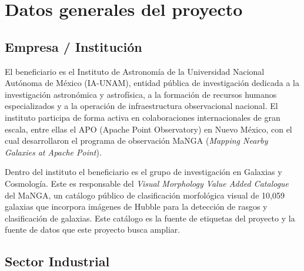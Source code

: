 \documentclass[12pt]{article}
\begin{document}
\newpage


\newpage

\tableofcontents

\newpage


\section{Datos generales del proyecto}

\subsection{Empresa / Institución}

El beneficiario es el Instituto de Astronomía de la Universidad Nacional Autónoma de México (IA-UNAM), entidad pública de investigación dedicada a la investigación astronómica y astrofísica, a la formación de recursos humanos especializados y a la operación de infraestructura observacional nacional. El instituto participa de forma activa en colaboraciones internacionales de gran escala, entre ellas el APO (Apache Point Observatory) en Nuevo México, con el cual desarrollaron el programa de observación MaNGA (\textit{Mapping Nearby Galaxies at Apache Point}).

Dentro del instituto el beneficiario es el grupo de investigación en Galaxias y Cosmología. Este es responsable del \textit{Visual Morphology Value Added Catalogue} del MaNGA, un catálogo público de clasificación morfológica visual de 10,059 galaxias que incorpora imágenes de Hubble para la detección de rasgos y clasificación de galaxias. Este catálogo es la fuente de etiquetas del proyecto y la fuente de datos que este proyecto busca ampliar.

\subsection{Sector Industrial}
\end{document}
